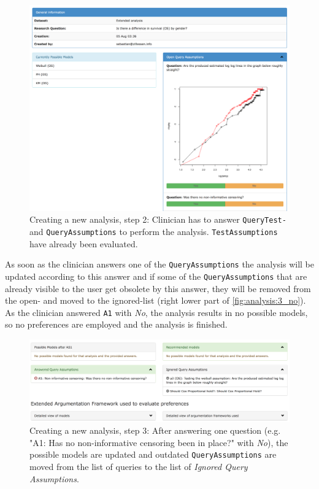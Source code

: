 \begin{figure}[h]
	\centering
	\includegraphics[width=\textwidth]{figures/ui_analysis_1}
	\caption{Creating a new analysis, step 2: Clinician has to answer \texttt{QueryTest-} and \texttt{QueryAssumptions} to perform the analysis. \texttt{TestAssumptions} have already been evaluated.}
	\label{fig:analysis:2}
\end{figure}


As soon as the clinician answers one of the \texttt{QueryAssumptions} the analysis will be updated according to this answer and if some of the \texttt{QueryAssumptions} that are already visible to the user get obsolete by this answer, they will be removed from the open- and moved to the ignored-list (right lower part of \autoref{fig:analysis:3_no}). 
As the clinician answered \texttt{A1} with \textit{No}, the analysis results in no possible models, so no preferences are employed and the analysis is finished.

\begin{figure}[t]
	\centering
	\includegraphics[width=\textwidth]{figures/ui_analysis_2_no}
	\caption{Creating a new analysis, step 3: After answering one question (e.g. "A1: Has no non-informative censoring been in place?" with \textit{No}), the possible models are updated and outdated \texttt{QueryAssumptions} are moved from the list of queries to the list of \textit{Ignored Query Assumptions}.}
	\label{fig:analysis:3_no}
\end{figure}

